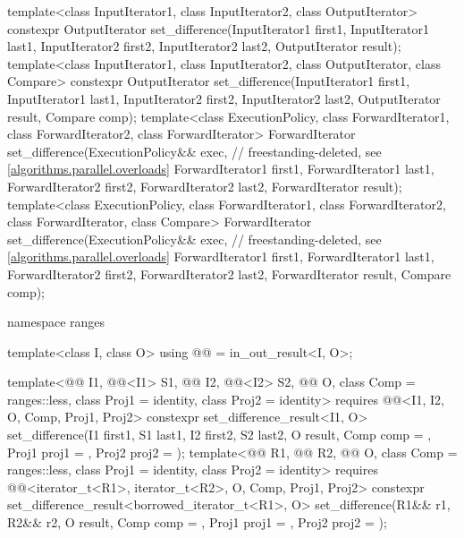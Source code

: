 \begin{codeblock}
{  template<class InputIterator1, class InputIterator2, class OutputIterator>
    constexpr OutputIterator
      set_difference(InputIterator1 first1, InputIterator1 last1,
                     InputIterator2 first2, InputIterator2 last2,
                     OutputIterator result);
  template<class InputIterator1, class InputIterator2, class OutputIterator, class Compare>
    constexpr OutputIterator
      set_difference(InputIterator1 first1, InputIterator1 last1,
                     InputIterator2 first2, InputIterator2 last2,
                     OutputIterator result, Compare comp);
  template<class ExecutionPolicy, class ForwardIterator1, class ForwardIterator2,
           class ForwardIterator>
    ForwardIterator
      set_difference(ExecutionPolicy&& exec,                    // freestanding-deleted, see \ref{algorithms.parallel.overloads}
                     ForwardIterator1 first1, ForwardIterator1 last1,
                     ForwardIterator2 first2, ForwardIterator2 last2,
                     ForwardIterator result);
  template<class ExecutionPolicy, class ForwardIterator1, class ForwardIterator2,
           class ForwardIterator, class Compare>
    ForwardIterator
      set_difference(ExecutionPolicy&& exec,                    // freestanding-deleted, see \ref{algorithms.parallel.overloads}
                     ForwardIterator1 first1, ForwardIterator1 last1,
                     ForwardIterator2 first2, ForwardIterator2 last2,
                     ForwardIterator result, Compare comp);

  namespace ranges {
    template<class I, class O>
      using @@ = in_out_result<I, O>;

    template<@@ I1, @@<I1> S1, @@ I2, @@<I2> S2,
             @@ O, class Comp = ranges::less,
             class Proj1 = identity, class Proj2 = identity>
      requires @@<I1, I2, O, Comp, Proj1, Proj2>
      constexpr set_difference_result<I1, O>
        set_difference(I1 first1, S1 last1, I2 first2, S2 last2, O result,
                       Comp comp = {}, Proj1 proj1 = {}, Proj2 proj2 = {});
    template<@@ R1, @@ R2, @@ O,
             class Comp = ranges::less, class Proj1 = identity, class Proj2 = identity>
      requires @@<iterator_t<R1>, iterator_t<R2>, O, Comp, Proj1, Proj2>
      constexpr set_difference_result<borrowed_iterator_t<R1>, O>
        set_difference(R1&& r1, R2&& r2, O result,
                       Comp comp = {}, Proj1 proj1 = {}, Proj2 proj2 = {});

}}
\end{codeblock}

